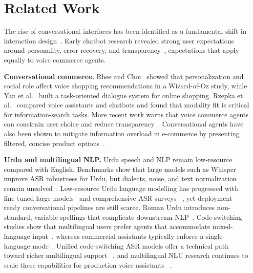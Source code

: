\documentclass[conference]{IEEEtran}
\begin{document}
\section{Related Work}

The rise of conversational interfaces has been identified as a
fundamental shift in interaction design~\cite{mctear2016rise}.
Early chatbot research revealed strong user expectations around
personality, error recovery, and transparency~\cite{zamora2017dave},
expectations that apply equally to voice commerce agents.

\textbf{Conversational commerce.}
Rhee and Choi~\cite{rhee2020voice} showed that personalization and
social role affect voice shopping recommendations in a Wizard-of-Oz
study, while Yan et al.~\cite{yan2017shopping} built a task-oriented
dialogue system for online shopping. Rzepka et al.~\cite{rzepka2022voice}
compared voice assistants and chatbots and found that modality fit is
critical for information-search tasks. More recent work warns that
voice commerce agents can constrain user choice and reduce
transparency~\cite{rabassa2022commerce}. Conversational agents have
also been shown to mitigate information overload in e-commerce by
presenting filtered, concise product options~\cite{ocon2020overload}.

\textbf{Urdu and multilingual NLP.}
Urdu speech and NLP remain low-resource compared with English.
Benchmarks show that large models such as Whisper improve ASR
robustness for Urdu, but dialects, noise, and text normalization
remain unsolved~\cite{arif2025wer,radford2023whisper}. Low-resource
Urdu language modelling has progressed with fine-tuned large models~%
\cite{fiaz2025urdullama} and comprehensive ASR surveys~%
\cite{sharif2024urdu}, yet deployment-ready conversational pipelines
are still scarce. Roman Urdu introduces non-standard, variable
spellings that complicate downstream NLP~\cite{mehmood2019roman}.
Code-switching studies show that multilingual users prefer agents that
accommodate mixed-language input~\cite{bawa2020codemix}, whereas
commercial assistants typically enforce a single-language
mode~\cite{kann2022plurilingualism}. Unified code-switching ASR models
offer a technical path toward richer multilingual support~%
\cite{dhawan2023codeswitching}, and multilingual NLU research continues
to scale these capabilities for production voice assistants~%
\cite{zhang2021language}.
\end{document}
